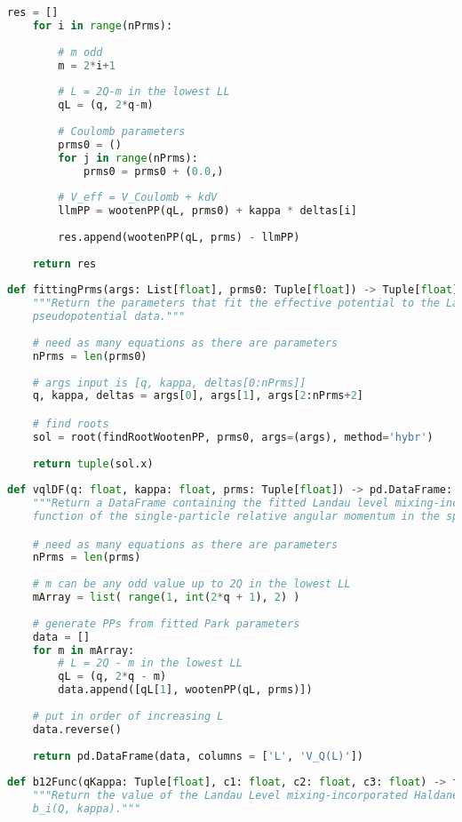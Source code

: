 \begin{lstlisting}[language=Python]
    res = []
    for i in range(nPrms):
        
        # m odd
        m = 2*i+1
        
        # L = 2Q-m in the lowest LL
        qL = (q, 2*q-m)
        
        # Coulomb parameters
        prms0 = ()
        for j in range(nPrms):
            prms0 = prms0 + (0.0,)
        
        # V_eff = V_Coulomb + kdV
        llmPP = wootenPP(qL, prms0) + kappa * deltas[i]
        
        res.append(wootenPP(qL, prms) - llmPP)
    
    return res
    
def fittingPrms(args: List[float], prms0: Tuple[float]) -> Tuple[float]:
    """Return the parameters that fit the effective potential to the Landau level mixing-incorporated Haldane
    pseudopotential data."""
    
    # need as many equations as there are parameters
    nPrms = len(prms0)
    
    # args input is [q, kappa, deltas[0:nPrms]]
    q, kappa, deltas = args[0], args[1], args[2:nPrms+2]

    # find roots
    sol = root(findRootWootenPP, prms0, args=(args), method='hybr')
    
    return tuple(sol.x)
    
def vqlDF(q: float, kappa: float, prms: Tuple[float]) -> pd.DataFrame:
    """Return a DataFrame containing the fitted Landau level mixing-incorporated Haldane pseudopotentials as a 
    function of the single-particle relative angular momentum in the spherical geometry L."""

    # need as many equations as there are parameters
    nPrms = len(prms)
    
    # m can be any odd value up to 2Q in the lowest LL
    mArray = list( range(1, int(2*q + 1), 2) )
    
    # generate PPs from fitted Park parameters
    data = []
    for m in mArray:
        # L = 2Q - m in the lowest LL
        qL = (q, 2*q - m)
        data.append([qL[1], wootenPP(qL, prms)])
    
    # put in order of increasing L
    data.reverse()
    
    return pd.DataFrame(data, columns = ['L', 'V_Q(L)'])
    
def b12Func(qKappa: Tuple[float], c1: float, c2: float, c3: float) -> float:
    """Return the value of the Landau Level mixing-incorporated Haldane pseudopotential parameter function 
    b_i(Q, kappa)."""
    

\end{lstlisting}
